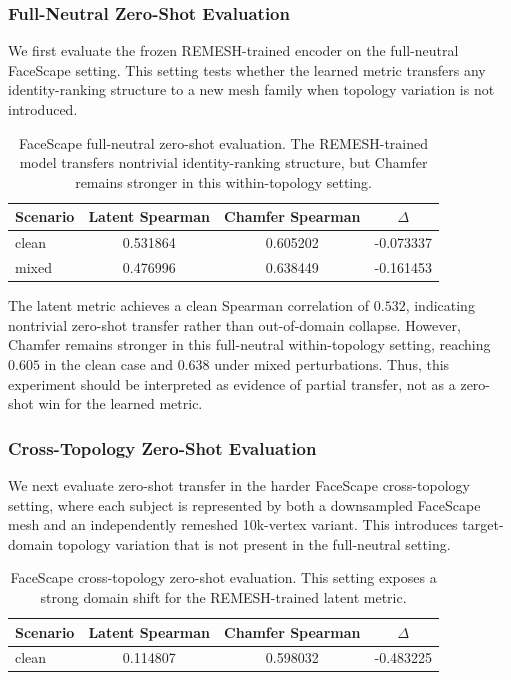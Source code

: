 \subsubsection{Full-Neutral Zero-Shot Evaluation}
\label{app:faceverse_full_neutral}

We first evaluate the frozen REMESH-trained encoder on the full-neutral
FaceScape setting. This setting tests whether the learned metric transfers any
identity-ranking structure to a new mesh family when topology variation is not
introduced.

\begin{table}[h]
\centering
\footnotesize
\caption{
FaceScape full-neutral zero-shot evaluation. The REMESH-trained model transfers
nontrivial identity-ranking structure, but Chamfer remains stronger in this
within-topology setting.
}
\label{tab:faceverse_full_neutral_app}
\begin{tabular}{lccc}
\toprule
Scenario & Latent Spearman & Chamfer Spearman & $\Delta$ \\
\midrule
clean & 0.531864 & 0.605202 & -0.073337 \\
mixed & 0.476996 & 0.638449 & -0.161453 \\
\bottomrule
\end{tabular}
\end{table}

The latent metric achieves a clean Spearman correlation of $0.532$, indicating
nontrivial zero-shot transfer rather than out-of-domain collapse. However,
Chamfer remains stronger in this full-neutral within-topology setting, reaching
$0.605$ in the clean case and $0.638$ under mixed perturbations. Thus, this
experiment should be interpreted as evidence of partial transfer, not as a
zero-shot win for the learned metric.

\subsubsection{Cross-Topology Zero-Shot Evaluation}
\label{app:faceverse_xtopo_zeroshot}

We next evaluate zero-shot transfer in the harder FaceScape cross-topology
setting, where each subject is represented by both a downsampled FaceScape mesh
and an independently remeshed 10k-vertex variant. This introduces target-domain
topology variation that is not present in the full-neutral setting.

\begin{table}[h]
\centering
\footnotesize
\caption{
FaceScape cross-topology zero-shot evaluation. This setting exposes a strong
domain shift for the REMESH-trained latent metric.
}
\label{tab:faceverse_xtopo_zeroshot_app}
\begin{tabular}{lccc}
\toprule
Scenario & Latent Spearman & Chamfer Spearman & $\Delta$ \\
\midrule
clean & 0.114807 & 0.598032 & -0.483225 \\
\bottomrule
\end{tabular}
\end{table}

